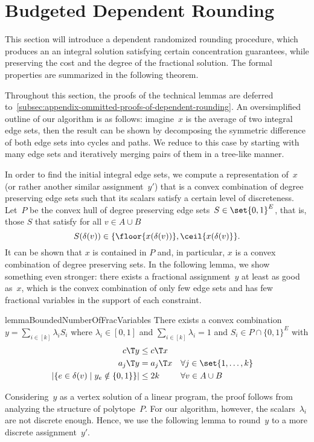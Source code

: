 \section{Budgeted Dependent Rounding}
\label{sec:dependent-randomized-rounding}

This section will introduce a dependent randomized rounding procedure,
which produces an an integral solution satisfying certain concentration guarantees, while preserving the cost and the degree of the fractional solution.
The formal properties are summarized in the following theorem.

\RDR*
\medskip

Throughout this section, the proofs of the technical lemmas are deferred to~\cref{subsec:appendix-ommitted-proofs-of-dependent-rounding}.
An oversimplified outline of our algorithm is as follows:
imagine~$x$ is
the average of two integral edge sets, then
the result can be shown by decomposing the
symmetric difference of both edge sets into cycles and paths.
We reduce to this case by starting with many edge sets and iteratively merging pairs of them in
a tree-like manner.

In order to find the initial integral edge sets, we compute a representation of~$x$ (or rather another similar assignment~$y'$) that is a convex
combination of degree preserving edge sets
such that its scalars satisfy
a certain level of discreteness.
Let~$P$ be the convex hull of degree preserving edge sets~$S \in \set{0,1}^E$, that is, those $S$ that satisfy for all $v\in A\cup B$
\begin{equation*}
    S(\delta(v))\in\{\floor{x(\delta(v))}, \ceil{x(\delta(v)}\}.
\end{equation*}
It can be shown that $x$ is contained in $P$ and,
in particular, $x$ is a convex combination of
degree preserving sets. 
In the following lemma, we show something even stronger: there
exists a fractional assignment~$y$ at least
as good as~$x$, which is the
convex combination of only few edge sets
and has few fractional
variables in the support of each constraint.

\begin{restatable}{lemma}{BoundedNumberOfFracVariables}
    \label{lem:bounded-number-of-frac-variables}
    There exists a convex combination $y = \sum_{i \in [k]} \lambda_i S_i$
    where $\lambda_i \in [0,1]$ and $\sum_{i \in [k]} \lambda_i = 1$ and $S_i \in P \cap \{0,1\}^E$ with
    \begin{align}
        c\T y &\le c\T x & \\
        a_j\T y &= a_j\T x &&\forall j \in \set{1,\dotsc,k} \\
        |\{e\in \delta(v) \mid y_e \notin \{0, 1\}\}| &\le 2k &&\forall v\in A\cup B & \label{eq:sos-bounded-support}
    \end{align}
\end{restatable}
Considering~$y$ as a vertex solution of a linear program, the proof follows from analyzing the structure of polytope~$P$.
For our algorithm, however, the scalars~$\lambda_i$ are not discrete enough.
Hence, we use the following lemma to round~$y$ to a more discrete assignment~$y'$.

